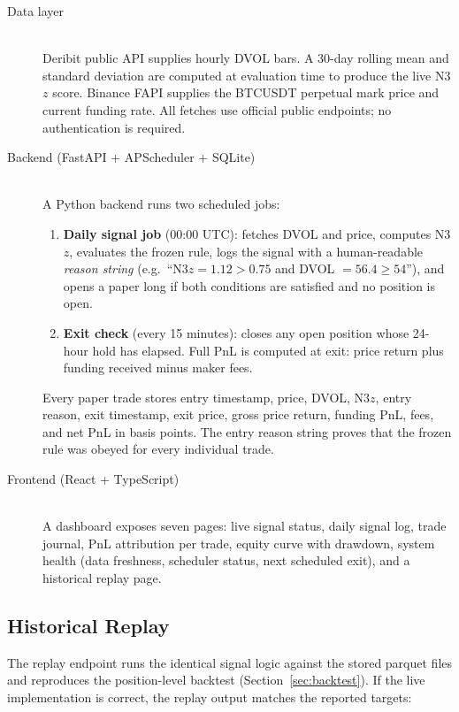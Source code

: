 \documentclass[12pt, a4paper]{article}
\theoremstyle{definition}
\begin{document}
\begin{description}
  \item[Data layer] \hfill \\
    Deribit public API supplies hourly DVOL bars.  A 30-day rolling mean and
    standard deviation are computed at evaluation time to produce the live
    N3$z$ score.  Binance FAPI supplies the BTCUSDT perpetual mark price and
    current funding rate.  All fetches use official public endpoints; no
    authentication is required.

  \item[Backend (FastAPI + APScheduler + SQLite)] \hfill \\
    A Python backend runs two scheduled jobs:
    \begin{enumerate}
      \item \textbf{Daily signal job} (00:00 UTC): fetches DVOL and price,
            computes N3$z$, evaluates the frozen rule, logs the signal with a
            human-readable \emph{reason string} (e.g.\ ``N3$z = 1.12 > 0.75$ and
            DVOL $= 56.4 \geq 54$''), and opens a paper long if both conditions
            are satisfied and no position is open.
      \item \textbf{Exit check} (every 15 minutes): closes any open position
            whose 24-hour hold has elapsed.  Full PnL is computed at exit:
            price return plus funding received minus maker fees.
    \end{enumerate}
    Every paper trade stores entry timestamp, price, DVOL, N3$z$, entry reason,
    exit timestamp, exit price, gross price return, funding PnL, fees, and net
    PnL in basis points.  The entry reason string proves that the frozen rule
    was obeyed for every individual trade.

  \item[Frontend (React + TypeScript)] \hfill \\
    A dashboard exposes seven pages: live signal status, daily signal log,
    trade journal, PnL attribution per trade, equity curve with drawdown,
    system health (data freshness, scheduler status, next scheduled exit), and
    a historical replay page.
\end{description}

\subsection{Historical Replay}

The replay endpoint runs the identical signal logic against the stored parquet
files and reproduces the position-level backtest (Section~\ref{sec:backtest}).
If the live implementation is correct, the replay output matches the reported
targets:
\end{document}
